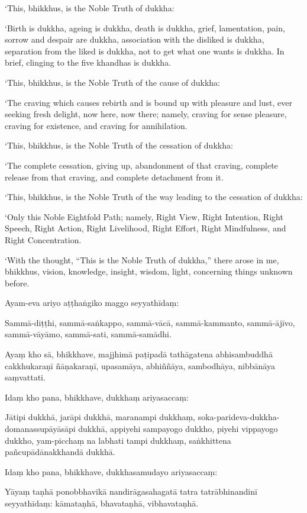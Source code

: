 ‘This, bhikkhus, is the Noble Truth of dukkha:

‘Birth is dukkha, ageing is dukkha, death is dukkha, grief,
lamentation, pain, sorrow and despair are dukkha, association with the
disliked is dukkha, separation from the liked is dukkha, not to get what
one wants is dukkha. In brief, clinging to the five khandhas is dukkha.

‘This, bhikkhus, is the Noble Truth of the cause of dukkha:

‘The craving which causes rebirth and is bound up with pleasure and
lust, ever seeking fresh delight, now here, now there; namely, craving
for sense pleasure, craving for existence, and craving for annihilation.

‘This, bhikkhus, is the Noble Truth of the cessation of dukkha:

‘The complete cessation, giving up, abandonment of that craving,
complete release from that craving, and complete detachment from it.

‘This, bhikkhus, is the Noble Truth of the way leading to the cessation
of dukkha:

‘Only this Noble Eightfold Path; namely, Right View, Right Intention,
Right Speech, Right Action, Right Livelihood, Right Effort, Right
Mindfulness, and Right Concentration.

‘With the thought, “This is the Noble Truth of dukkha,” there arose in
me, bhikkhus, vision, knowledge, insight, wisdom, light, concerning
things unknown before.

\clearpage

\paliText
\markboth{\paliTitle}{\rightmark}

Ayam-eva ariyo aṭṭhaṅgiko maggo seyyathīdaṃ:

Sammā-diṭṭhi, sammā-saṅkappo, sammā-vācā, sammā-kammanto, sammā-ājīvo,
sammā-vāyāmo, sammā-sati, sammā-samādhi.

Ayaṃ kho sā, bhikkhave, majjhimā paṭipadā tathāgatena abhisambuddhā
cakkhukaraṇī ñāṇakaraṇī, upasamāya, abhiññāya, sambodhāya, nibbānāya
saṃvattati.

Idaṃ kho pana, bhikkhave, dukkhaṃ ariyasaccaṃ:

Jātipi dukkhā, jarāpi dukkhā, maranampi dukkhaṃ,
soka-parideva-dukkha-domanassupāyāsāpi dukkhā, appiyehi sampayogo
dukkho, piyehi vippayogo dukkho, yam-picchaṃ na labhati tampi dukkhaṃ,
saṅkhittena pañcupādānakkhandā dukkhā.

Idaṃ kho pana, bhikkhave, dukkhasamudayo ariyasaccaṃ:

Yāyaṃ taṇhā ponobbhavikā nandirāgasahagatā tatra tatrābhinandinī
seyyathīdaṃ: kāmataṇhā, bhavataṇhā, vibhavataṇhā.

